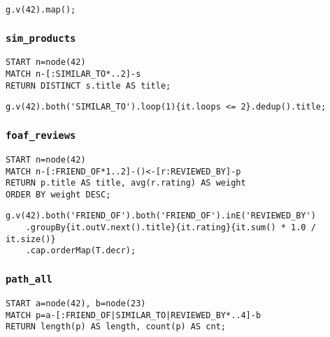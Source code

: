 \begin{lstlisting}
g.v(42).map();
\end{lstlisting}

\subsubsection*{\texttt{sim\_products}}

\begin{lstlisting}
START n=node(42) 
MATCH n-[:SIMILAR_TO*..2]-s 
RETURN DISTINCT s.title AS title;
\end{lstlisting}

\begin{lstlisting}
g.v(42).both('SIMILAR_TO').loop(1){it.loops <= 2}.dedup().title;
\end{lstlisting}

\subsubsection*{\texttt{foaf\_reviews}}

\begin{lstlisting}
START n=node(42)
MATCH n-[:FRIEND_OF*1..2]-()<-[r:REVIEWED_BY]-p
RETURN p.title AS title, avg(r.rating) AS weight
ORDER BY weight DESC;
\end{lstlisting}

\begin{lstlisting}
g.v(42).both('FRIEND_OF').both('FRIEND_OF').inE('REVIEWED_BY')
	.groupBy{it.outV.next().title}{it.rating}{it.sum() * 1.0 / it.size()}
	.cap.orderMap(T.decr);
\end{lstlisting}

\subsubsection*{\texttt{path\_all}}

\begin{lstlisting}
START a=node(42), b=node(23) 
MATCH p=a-[:FRIEND_OF|SIMILAR_TO|REVIEWED_BY*..4]-b 
RETURN length(p) AS length, count(p) AS cnt;
\end{lstlisting}

